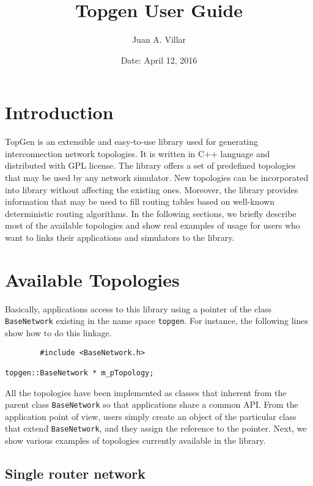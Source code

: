 \documentclass[12pt,onecolumn]{report}
\title{Topgen User Guide}
\author{Juan A. Villar}
\date{Date: April 12, 2016}
\begin{document}
\maketitle

\section{Introduction}

TopGen is an extensible and easy-to-use library used for generating interconnection network topologies. It is written in C++ language and distributed with GPL license. The library offers a set of predefined topologies that may be used by any network simulator. New topologies can be incorporated into library without affecting the existing ones. Moreover, the library provides information that may be used to fill routing tables based on well-known deterministic routing algorithms. In the following sections, we briefly describe most of the available topologies and show real examples of usage for users who want to links their applications and simulators to the library.

\section{Available Topologies}

Basically, applications access to this library using a pointer of the class \verb|BaseNetwork| existing in the name space \verb|topgen|. For instance, the following lines show how to do this linkage. 

\begin{lstlisting}
        #include <BaseNetwork.h>

topgen::BaseNetwork * m_pTopology; 
\end{lstlisting}

All the topologies have been implemented as classes that inherent from the parent class \verb|BaseNetwork| so that applications share a common API. From the application point of view, users simply create an object of the particular class that extend \verb|BaseNetwork|, and they assign the reference to the pointer. Next, we show various examples of topologies currently available in the library.

\subsection*{Single router network}
\end{document}
